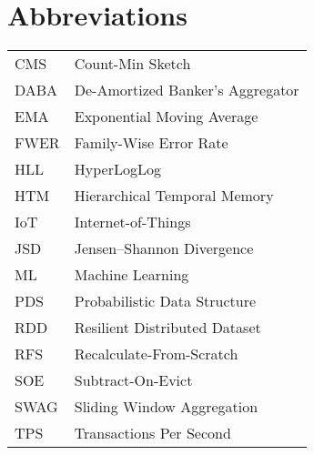 \chapter*{Abbreviations}

\begin{flushleft}
\begin{tabular}{l p{0.8\linewidth}}
CMS & Count-Min Sketch \\
DABA & De-Amortized Banker’s Aggregator\\
EMA & Exponential Moving Average\\
FWER & Family-Wise Error Rate\\
HLL & HyperLogLog\\
HTM & Hierarchical Temporal Memory\\
IoT & Internet-of-Things\\ 
JSD & Jensen–Shannon Divergence\\
ML & Machine Learning\\ 
PDS & Probabilistic Data Structure\\
RDD & Resilient Distributed Dataset\\
RFS & Recalculate-From-Scratch\\ 
SOE & Subtract-On-Evict\\ 
SWAG & Sliding Window Aggregation\\
TPS & Transactions Per Second\\ 
\end{tabular}
\end{flushleft}

